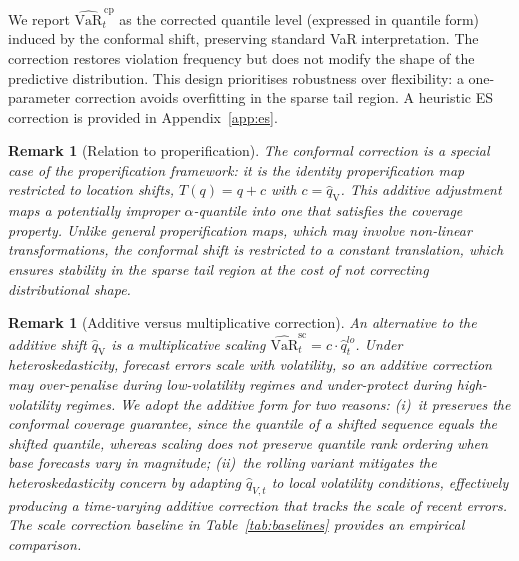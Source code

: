 \documentclass[preprint,11pt,authoryear]{elsarticle}
\newtheorem{remark}[theorem]{Remark}
\newcommand{\VaR}{\mathrm{VaR}}
\newcommand{\1}{\boldsymbol{1}}
\newcommand{\qV}{\hat{q}_{\scriptscriptstyle\mathrm{V}}}
\begin{document}
	We report $\widehat{\VaR}_t^{\,\mathrm{cp}}$ as the corrected quantile level (expressed in quantile form) induced by the conformal shift, preserving standard VaR interpretation.
	The correction restores violation frequency but does not
	modify the shape of the predictive distribution. This design
	prioritises robustness over flexibility: a one-parameter
	correction avoids overfitting in the sparse tail region. A
	heuristic ES correction is provided in
	Appendix~\ref{app:es}.
	
	\begin{remark}[Relation to properification]
		The conformal correction is a special case of the
		\citet{brehmer2021properification} properification framework:
		it is the identity properification map restricted to location
		shifts, $T(q) = q + c$ with $c = \qV$. This additive
		adjustment maps a potentially improper $\alpha$-quantile into
		one that satisfies the coverage property. Unlike general
		properification maps, which may involve non-linear
		transformations, the conformal shift is restricted to a
		constant translation, which ensures stability in the
		sparse tail region at the cost of not correcting
		distributional shape.
	\end{remark}
	
	\begin{remark}[Additive versus multiplicative correction]
		An alternative to the additive shift $\qV$ is a
		multiplicative scaling
		$\widehat{\VaR}_t^{\mathrm{sc}} = c \cdot
		\hat{q}_t^{lo}$. Under heteroskedasticity, forecast errors
		scale with volatility, so an additive correction may
		over-penalise during low-volatility regimes and
		under-protect during high-volatility regimes. We adopt the
		additive form for two reasons: (i)~it preserves the
		conformal coverage guarantee, since the quantile of a
		shifted sequence equals the shifted quantile, whereas
		scaling does not preserve quantile rank ordering when base
		forecasts vary in magnitude; (ii)~the rolling variant
		mitigates the heteroskedasticity concern by adapting
		$\hat{q}_{V,t}$ to local volatility conditions, effectively
		producing a time-varying additive correction that tracks the
		scale of recent errors. The scale correction baseline in
		Table~\ref{tab:baselines} provides an empirical comparison.
	\end{remark}
\end{document}
